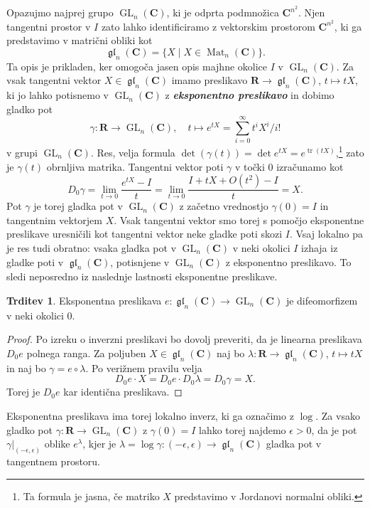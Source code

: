 \documentclass[11pt]{book}
\def\RR{\mathbf{R}}
\def\CC{\mathbf{C}}
\DeclareMathOperator\tr{tr}
\DeclareMathOperator\GL{GL}
\DeclareMathOperator\glfrak{\mathfrak{gl}}
\DeclareMathOperator\Mat{Mat}
\def\definicija{\color{rdeca}\bf\em}
\theoremstyle{definition}
\theoremstyle{zgled}
\theoremstyle{odprtproblem}
\theoremstyle{domacanaloga}
\newenvironment{dokaz}
    {\color{siva}\begin{proof}}
    {\end{proof}}
\theoremstyle{izrek}
\newtheorem*{trditev}{Trditev}
\begin{document}
Opazujmo najprej grupo $\GL_n(\CC)$, ki je odprta podmnožica $\CC^{n^2}$. Njen tangentni prostor v $I$ zato lahko identificiramo z vektorskim prostorom $\CC^{n^2}$, ki ga predstavimo v matrični obliki kot
\[
    \textstyle \glfrak_n(\CC) = \{ X \mid X \in \Mat_{n}(\CC) \}.
\]
Ta opis je prikladen, ker omogoča jasen opis majhne okolice $I$ v $\GL_n(\CC)$. Za vsak tangentni vektor $X \in \glfrak_n(\CC)$ imamo preslikavo $\RR \to \glfrak_n(\CC)$, $t \mapsto tX$, ki jo lahko potisnemo v $\GL_n(\CC)$ z {\definicija eksponentno preslikavo} in dobimo gladko pot
\[
    \gamma \colon \RR \to {\textstyle \GL_n(\CC)}, \quad
    t \mapsto e^{tX} = \sum_{i = 0}^{\infty} t^i X^i / i!
\]
v grupi $\GL_n(\CC)$. Res, velja formula $\det(\gamma(t)) = \det e^{tX} = e^{\tr (tX)}$,\footnote{Ta formula je jasna, če matriko $X$ predstavimo v Jordanovi normalni obliki.} zato je $\gamma(t)$ obrnljiva matrika. Tangentni vektor poti $\gamma$ v točki $0$ izračunamo kot
\[
    D_0 \gamma 
    = \lim_{t \to 0} \frac{e^{tX} - I}{t}
    = \lim_{t \to 0} \frac{I + tX + O(t^2) - I}{t}
    = X.
\]
Pot $\gamma$ je torej gladka pot v $\GL_n(\CC)$ z začetno vrednostjo $\gamma(0) = I$ in tangentnim vektorjem $X$. Vsak tangentni vektor smo torej s pomočjo eksponentne preslikave uresničili kot tangentni vektor neke gladke poti skozi $I$. Vsaj lokalno pa je res tudi obratno: vsaka gladka pot v $\GL_n(\CC)$ v neki okolici $I$ izhaja iz gladke poti v $\glfrak_n(\CC)$, potisnjene v $\GL_n(\CC)$ z eksponentno preslikavo. To sledi neposredno iz naslednje lastnosti eksponentne preslikave.

\begin{trditev}
Eksponentna preslikava $e \colon \glfrak_n(\CC) \to \GL_n(\CC)$ je difeomorfizem v neki okolici $0$.
\end{trditev}
\begin{dokaz}
Po izreku o inverzni preslikavi bo dovolj preveriti, da je linearna preslikava $D_0 e$ polnega ranga. Za poljuben $X \in \glfrak_n(\CC)$ naj bo $\lambda \colon \RR \to \glfrak_n(\CC)$, $t \mapsto tX$ in naj bo $\gamma = e \circ \lambda$. Po verižnem pravilu velja
\[
    D_0 e \cdot X
    = D_0 e \cdot D_0 \lambda
    = D_0 \gamma
    = X.
\]
Torej je $D_0 e$ kar identična preslikava. 
\end{dokaz}

Eksponentna preslikava ima torej lokalno inverz, ki ga označimo z $\log$. Za vsako gladko pot $\gamma \colon \RR \to \GL_n(\CC)$ z $\gamma(0) = I$ lahko torej najdemo $\epsilon > 0$, da je pot $\gamma |_{(-\epsilon, \epsilon)}$ oblike $e^{\lambda}$, kjer je $\lambda = \log \gamma \colon (-\epsilon, \epsilon) \to \glfrak_n(\CC)$ gladka pot v tangentnem prostoru.
\end{document}
